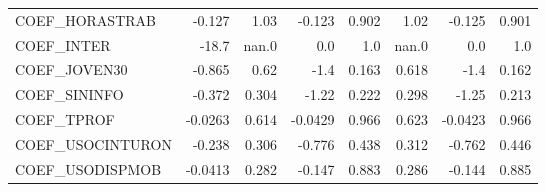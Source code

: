 \begin{tabular}{lrrrrrrr}
COEF\_HORASTRAB   &   -0.127 &     1.03 &   -0.123 &    0.902 &          1.02 &       -0.125 &         0.901 \\
COEF\_INTER       &    -18.7 &    nan.0 &      0.0 &      1.0 &         nan.0 &          0.0 &           1.0 \\
COEF\_JOVEN30     &   -0.865 &     0.62 &     -1.4 &    0.163 &         0.618 &         -1.4 &         0.162 \\
COEF\_SININFO     &   -0.372 &    0.304 &    -1.22 &    0.222 &         0.298 &        -1.25 &         0.213 \\
COEF\_TPROF       &  -0.0263 &    0.614 &  -0.0429 &    0.966 &         0.623 &      -0.0423 &         0.966 \\
COEF\_USOCINTURON &   -0.238 &    0.306 &   -0.776 &    0.438 &         0.312 &       -0.762 &         0.446 \\
COEF\_USODISPMOB  &  -0.0413 &    0.282 &   -0.147 &    0.883 &         0.286 &       -0.144 &         0.885 \\
\bottomrule
\end{tabular}

